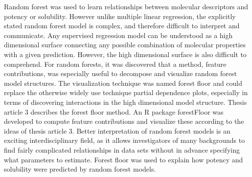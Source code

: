 Random forest was used to learn relationships between molecular descriptors and potency or solubility. However unlike multiple linear regression, the explicitly stated random forest model is complex, and therefore difficult to interpret and communicate. Any supervised regression model can be understood as a high dimensional surface connecting any possible combination of molecular properties with a given prediction. However, the high dimensional surface is also difficult to comprehend. For random forests, it was discovered that a method, feature contributions, was especially useful to decompose and visualize random forest model structures. The visualization technique was named forest floor and could replace the otherwise widely use technique partial dependence plots, especially in terms of discovering interactions in the high dimensional model structure. Thesis article 3 describes the forest floor method. An R package forestFloor was developed to compute feature contributions and visualize these according to the ideas of thesis article 3. Better interpretation of random forest models is an exciting interdisciplinary field, as it allows investigators of many backgrounds to find fairly complicated relationships in data sets without in advance specifying what parameters to estimate. Forest floor was used to explain how potency and solubility were predicted by random forest models.